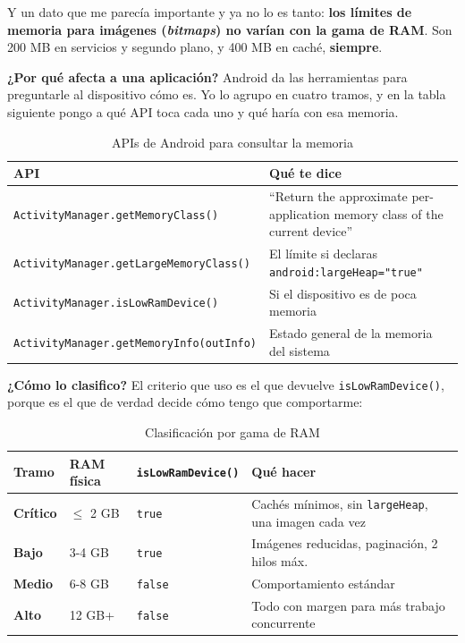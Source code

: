 \documentclass[11pt,a4paper]{article}
\newcommand{\code}[1]{\texttt{\color{ink}#1}}
\newcommand{\campo}[1]{\textbf{\color{ink}#1}}
\begin{document}
	Y un dato que me parecía importante y ya no lo es tanto: \textbf{los límites de memoria para imágenes (\emph{bitmaps}) no varían con la gama de RAM}. Son 200 MB en servicios y segundo plano, y 400 MB en caché, \textbf{siempre}.
	
	\campo{¿Por qué afecta a una aplicación?}
	Android da las herramientas para preguntarle al dispositivo cómo es. Yo lo agrupo en cuatro tramos, y en la tabla siguiente pongo a qué API toca cada uno y qué haría con esa memoria.
	
	\begin{table}[htbp]
		\centering
		\small
		\begin{tabularx}{\textwidth}{@{}>{\RaggedRight\arraybackslash}p{6cm} >{\RaggedRight\arraybackslash}X@{}}
			\toprule
			\rowcolor{primary}
			\textcolor{paper}{\sffamily\bfseries API} & \textcolor{paper}{\sffamily\bfseries Qué te dice} \\
			\midrule
			\code{ActivityManager.getMemoryClass()} & \enquote{Return the approximate per-application memory class of the current device} \\
			\rowcolor{soft}
			\code{ActivityManager.getLargeMemoryClass()} & El límite si declaras \code{android:largeHeap="true"} \\
			\code{ActivityManager.isLowRamDevice()} & Si el dispositivo es de poca memoria \\
			\rowcolor{soft}
			\code{ActivityManager.getMemoryInfo(outInfo)} & Estado general de la memoria del sistema \\
			\bottomrule
		\end{tabularx}
		\caption{APIs de Android para consultar la memoria}
	\end{table}
	
	\campo{¿Cómo lo clasifico?}
	El criterio que uso es el que devuelve \code{isLowRamDevice()}, porque es el que de verdad decide cómo tengo que comportarme:
	
	\begin{table}[htbp]
		\centering
		\small
		\begin{tabularx}{\textwidth}{@{}l l l >{\RaggedRight\arraybackslash}X@{}}
			\toprule
			\rowcolor{primary}
			\textcolor{paper}{\sffamily\bfseries Tramo} & \textcolor{paper}{\sffamily\bfseries RAM física} & \textcolor{paper}{\sffamily\bfseries \code{isLowRamDevice()}} & \textcolor{paper}{\sffamily\bfseries Qué hacer} \\
			\midrule
			\textbf{Crítico} & $\leq$ 2 GB & \code{true} & Cachés mínimos, sin \code{largeHeap}, una imagen cada vez \\
			\rowcolor{soft}
			\textbf{Bajo} & 3-4 GB & \code{true} & Imágenes reducidas, paginación, 2 hilos máx. \\
			\textbf{Medio} & 6-8 GB & \code{false} & Comportamiento estándar \\
			\rowcolor{soft}
			\textbf{Alto} & 12 GB+ & \code{false} & Todo con margen para más trabajo concurrente \\
			\bottomrule
		\end{tabularx}
		\caption{Clasificación por gama de RAM}
	\end{table}
	
\end{document}
